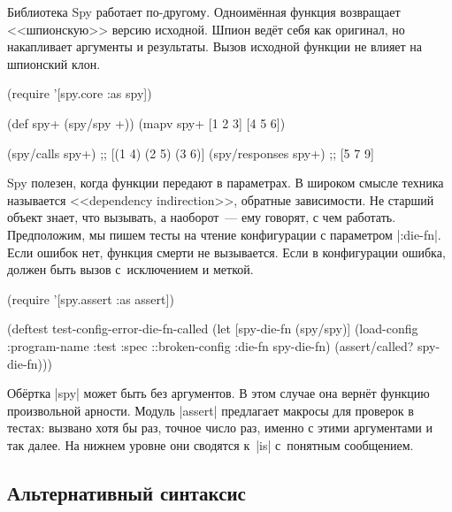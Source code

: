 
Библиотека Spy работает
по-другому. Одноимённая функция возвращает <<шпионскую>> версию исходной. Шпион
ведёт себя как оригинал, но накапливает аргументы и результаты. Вызов
исходной функции не влияет на шпионский клон.

\begin{english}
  \begin{clojure}
(require '[spy.core :as spy])

(def spy+ (spy/spy +))
(mapv spy+ [1 2 3] [4 5 6])

(spy/calls spy+)
;; [(1 4) (2 5) (3 6)]
(spy/responses spy+)
;; [5 7 9]
  \end{clojure}
\end{english}



Spy полезен, когда функции передают в параметрах. В широком смысле техника
называется <<dependency indirection>>, обратные зависимости. Не старший объект
знает, что вызывать, а наоборот~--- ему говорят, с чем работать. Предположим, мы
пишем тесты на чтение конфигурации с параметром \spverb|:die-fn|. Если ошибок
нет, функция смерти не вызывается. Если в конфигурации ошибка, должен быть вызов
с~исключением и меткой.

\begin{english}
  \begin{clojure}
(require '[spy.assert :as assert])

(deftest test-config-error-die-fn-called
  (let [spy-die-fn (spy/spy)]
    (load-config {:program-name :test
                  :spec ::broken-config
                  :die-fn spy-die-fn})
    (assert/called? spy-die-fn)))
  \end{clojure}
\end{english}

Обёртка \spverb|spy| может быть без аргументов. В этом случае она вернёт
функцию произвольной арности. Модуль \spverb|assert| предлагает макросы для
проверок в тестах: вызвано хотя бы раз, точное число раз, именно с этими
аргументами и так далее. На нижнем уровне они сводятся к~\spverb|is| с~понятным
сообщением.

\subsection{Альтернативный синтаксис}

